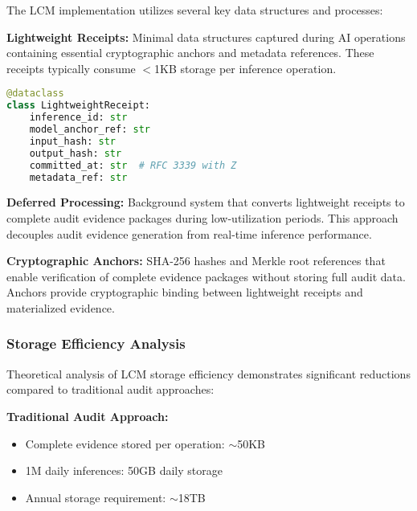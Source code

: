 \documentclass[12pt,a4paper]{article}
\begin{document}
The LCM implementation utilizes several key data structures and processes:

\textbf{Lightweight Receipts:} Minimal data structures captured during AI operations containing essential cryptographic anchors and metadata references. These receipts typically consume $<$1KB storage per inference operation.

\begin{lstlisting}[language=Python, caption=Lightweight Receipt Data Structure]
@dataclass
class LightweightReceipt:
    inference_id: str
    model_anchor_ref: str
    input_hash: str
    output_hash: str
    committed_at: str  # RFC 3339 with Z
    metadata_ref: str
\end{lstlisting}

\begin{center}
\end{center}

\textbf{Deferred Processing:} Background system that converts lightweight receipts to complete audit evidence packages during low-utilization periods. This approach decouples audit evidence generation from real-time inference performance.

\textbf{Cryptographic Anchors:} SHA-256 hashes and Merkle root references that enable verification of complete evidence packages without storing full audit data. Anchors provide cryptographic binding between lightweight receipts and materialized evidence.

\subsubsection{Storage Efficiency Analysis}

Theoretical analysis of LCM storage efficiency demonstrates significant reductions compared to traditional audit approaches:

\textbf{Traditional Audit Approach:}
\begin{itemize}
\item Complete evidence stored per operation: $\sim$50KB
\item 1M daily inferences: 50GB daily storage
\item Annual storage requirement: $\sim$18TB
\end{itemize}
\end{document}

